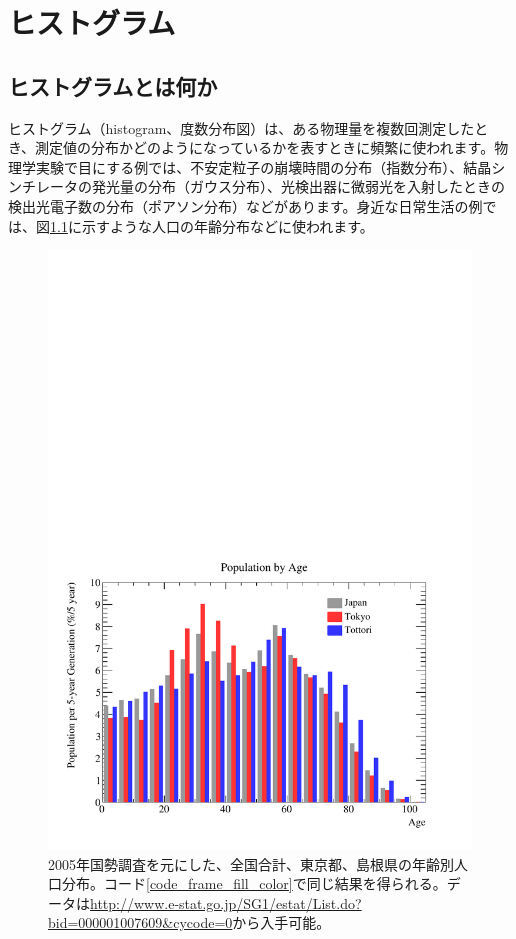 \chapter{ヒストグラム}
\label{chap_Histogram}

\section{ヒストグラムとは何か}

ヒストグラム（histogram、度数分布図）は、ある物理量を複数回測定したとき、測定値の分布かどのようになっているかを表すときに頻繁に使われます。物理学実験で目にする例では、不安定粒子の崩壊時間の分布（指数分布）、結晶シンチレータの発光量の分布（ガウス分布）、光検出器に微弱光を入射したときの検出光電子数の分布（ポアソン分布）などがあります。身近な日常生活の例では、図\ref{fig_population_pdf}に示すような人口の年齢分布などに使われます。

\begin{figure}
  \centering
  \includegraphics[width=12cm,clip]{fig/population.pdf}
  \caption{2005年国勢調査を元にした、全国合計、東京都、島根県の年齢別人口分布。コード\ref{code_frame_fill_color}で同じ結果を得られる。データは\url{http://www.e-stat.go.jp/SG1/estat/List.do?bid=000001007609&cycode=0}から入手可能。}
  \label{fig_population_pdf}
\end{figure}

